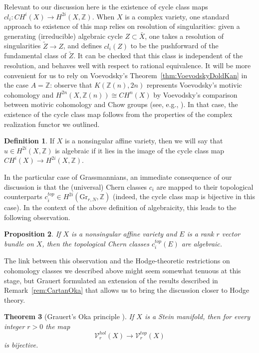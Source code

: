 \documentclass[11pt,leqno]{article}
\newcommand{\Z}{{\mathbb Z}}
\renewcommand{\1}{{\rm 1\hspace*{-0.4ex}%
\rule{0.1ex}{1.52ex}\hspace*{0.2ex}}}
\newcommand{\<}[1]{{\langle}#1 {\rangle}}
\theoremstyle{plain}
\newtheorem{theorem}{Theorem}[subsection]
\newtheorem{proposition}[theorem]{Proposition}
\theoremstyle{definition}
\newtheorem{defn}[theorem]{Definition}
\theoremstyle{remark}
\numberwithin{equation}{subsection}
\begin{document}
Relevant to our discussion here is the existence of cycle class maps $cl_i: CH^i(X) \to H^{2i}(X,\Z)$.  When $X$ is a complex variety, one standard approach to existence of this map relies on resolution of singularities: given a generating (irreducible) algebraic cycle $Z \subset \bar{X}$, one takes a resolution of singularities $\tilde{Z} \to Z$, and defines $cl_i(Z)$ to be the pushforward of the fundamental class of $\tilde{Z}$.  It can be checked that this class is independent of the resolution, and behaves well with respect to rational equivalence.  It will be more convenient for us to rely on Voevodsky's Theorem~\ref{thm:VoevodskyDoldKan} in the case $A = \Z$: observe that $K(\Z(n),2n)$ represents Voevodsky's motivic cohomology and $H^{2n}(X,\Z(n)) \cong CH^n(X)$ by Voevodsky's comparison between motivic cohomology and Chow groups (see, e.g., \cite[Corollary 19.2]{MVW}).  In that case, the existence of the cycle class map follows from the properties of the complex realization functor we outlined. 

\begin{defn}
	If $X$ is a nonsingular affine variety, then we will say that $u \in H^{2i}(X,\Z)$ is algebraic if it lies in the image of the cycle class map $CH^i(X) \to H^{2i}(X,\Z)$.
\end{defn}

In the particular case of Grassmannians, an immediate consequence of our discussion is that the (universal) Chern classes $c_i$ are mapped to their topological counterparts $c_i^{top} \in H^{2i}(\mathrm{Gr}_{r,N},\Z)$ (indeed, the cycle class map is bijective in this case).  In the context of the above definition of algebraicity, this leads to the following observation.

\begin{proposition}
	If $X$ is a nonsingular affine variety and $E$ is a rank $r$ vector bundle on $X$, then the topological Chern classes $c_i^{top}(E)$ are algebraic.
\end{proposition}

The link between this observation and the Hodge-theoretic restrictions on cohomology classes we described above might seem somewhat tenuous at this stage, but Grauert formulated an extension of the results described in Remark~\ref{rem:CartanOka} that allows us to bring the discussion closer to Hodge theory.

\begin{theorem}[Grauert's Oka principle {\cite{Grauert1958Analytische}}]
	\label{thm:grauertoka}
	If $X$ is a Stein manifold, then for every integer $r > 0$ the  map
	\[
	\mathscr{V}_r^{hol}(X) \longrightarrow \mathscr{V}_r^{top}(X)
	\]
	is bijective.
\end{theorem}
\end{document}
